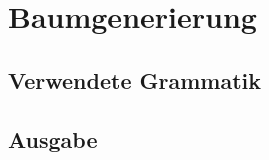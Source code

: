 \section{Baumgenerierung}

\subsection{Verwendete Grammatik}
\label{tree_generation_used_grammar}

\subsection{Ausgabe}